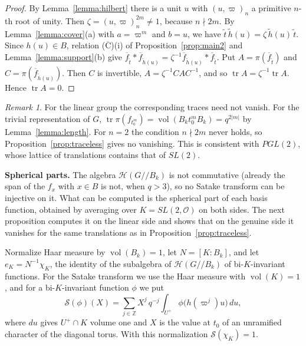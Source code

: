 \documentclass[12pt,letterpaper]{amsart}
\numberwithin{equation}{section}
\theoremstyle{definition}
\theoremstyle{remark}
\newtheorem{remark}[theorem]{Remark}
\DeclareMathOperator{\vol}{vol}
\DeclareMathOperator{\tr}{tr}
\newcommand{\cO}{\mathcal{O}}
\newcommand{\cH}{\mathcal{H}}
\newcommand{\Z}{\mathbb{Z}}
\newcommand{\fbar}{\overline{f}}
\newcommand{\Hlin}{\cH(G/\!/B_k)}
\begin{document}
\begin{proof}
By Lemma~\ref{lemma:hilbert} there is a unit $u$ with $(u,\varpi)_n$ a
primitive $n$-th root of unity. Then $\zeta=(u,\varpi)_n^{2m}\neq 1$,
because $n\nmid 2m$. By Lemma~\ref{lemma:cover}(a) with $a=\varpi^m$ and
$b=u$, we have $\tilde t\,\tilde h(u)=\zeta\,\tilde h(u)\,\tilde t$.
Since $h(u)\in B$, relation ($\overline{\mbox{C}}$)(i) of
Proposition~\ref{prop:main2} and Lemma~\ref{lemma:support}(b) give
$\fbar_{\tilde t}*\fbar_{\tilde h(u)}
=\zeta^{-1}\fbar_{\tilde h(u)}*\fbar_{\tilde t}$. Put
$A=\pi(\fbar_{\tilde t})$ and $C=\pi(\fbar_{\tilde h(u)})$. Then $C$ is
invertible, $A=\zeta^{-1}CAC^{-1}$, and so $\tr A=\zeta^{-1}\tr A$.
Hence $\tr A=0$.
\end{proof}

\begin{remark}
For the linear group the corresponding traces need not vanish. For the
trivial representation of $G$, $\tr\pi(f_{t_0^m})=\vol(B_kt_0^mB_k)
=q^{2|m|}$ by Lemma~\ref{lemma:length}. For $n=2$ the condition
$n\nmid 2m$ never holds, so Proposition~\ref{prop:traceless} gives no
vanishing. This is consistent with $PGL(2)$, whose lattice of translations
contains that of $SL(2)$.
\end{remark}

\medskip\noindent\textbf{Spherical parts.} The algebra $\Hlin$ is not commutative (already the span of the $f_x$
with $x\in B$ is not, when $q>3$), so no Satake transform can be
injective on it. What can be computed is the spherical part of each
basis function, obtained by averaging over $K=SL(2,\cO)$ on both sides.
The next proposition computes it on the linear side and shows that on
the genuine side it vanishes for the same translations as in
Proposition~\ref{prop:traceless}.

Normalize Haar measure by $\vol(B_k)=1$, let $N=[K:B_k]$, and let
$e_K=N^{-1}\chi_K$, the identity of the subalgebra of $\Hlin$ of
bi-$K$-invariant functions. For the Satake transform we use the Haar
measure with $\vol(K)=1$, and for a bi-$K$-invariant function $\phi$ we
put
\[
\mathcal S(\phi)(X)=\sum_{j\in\Z}X^j\,q^{-j}\int_{U^+}\phi\bigl(h(\varpi^j)u\bigr)\,du,
\]
where $du$ gives $U^+\cap K$ volume one and $X$ is the value at $t_0$ of
an unramified character of the diagonal torus. With this normalization
$\mathcal S(\chi_K)=1$.
\end{document}
